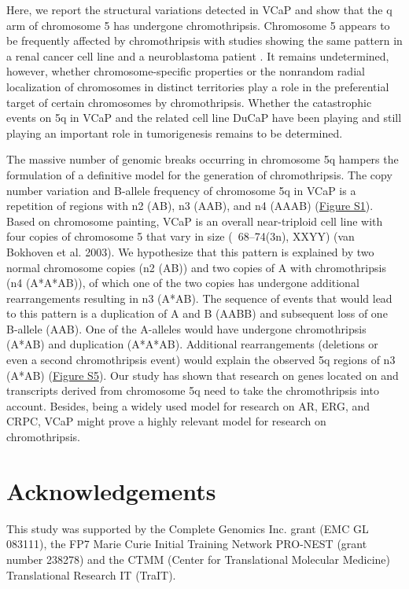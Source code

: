 Here, we report the structural variations detected in VCaP and show that the q arm of chromosome 5 has undergone chromothripsis.
Chromosome 5 appears to be frequently affected by chromothripsis with studies showing the same pattern in a renal cancer cell line
\cite{stephens2011massive} and a neuroblastoma patient \cite{molenaar2012sequencing}. It remains undetermined, however, whether chromosome-specific
properties or the nonrandom radial localization of chromosomes in distinct territories play a role in the preferential target of certain
chromosomes by chromothripsis. Whether the catastrophic events on 5q in VCaP and the related cell line DuCaP have been playing and still
playing an important role in tumorigenesis remains to be determined.

The massive number of genomic breaks occurring in chromosome 5q hampers the formulation of a definitive model for the generation of chromothripsis.
The copy number variation and B-allele frequency of chromosome 5q in VCaP is a repetition of regions with n2 (AB), n3 (AAB), and n4 (AAAB) (\href{https://link.springer.com/article/10.1007/s00439-013-1308-1#SupplementaryMaterial}{Figure S1}).
Based on chromosome painting, VCaP is an overall near-triploid cell line with four copies of chromosome 5 that vary in size (~68–74(3n), XXYY)
(van Bokhoven et al. 2003). We hypothesize that this pattern is explained by two normal chromosome copies (n2 (AB)) and two copies of A with
chromothripsis (n4 (A*A*AB)), of which one of the two copies has undergone additional rearrangements resulting in n3 (A*AB). The sequence of
events that would lead to this pattern is a duplication of A and B (AABB) and subsequent loss of one B-allele (AAB). One of the A-alleles would
have undergone chromothripsis (A*AB) and duplication (A*A*AB). Additional rearrangements (deletions or even a second chromothripsis event) would
explain the observed 5q regions of n3 (A*AB) (\href{https://link.springer.com/article/10.1007/s00439-013-1308-1#SupplementaryMaterial}{Figure S5}). Our study has shown that research on genes located on and transcripts derived from
chromosome 5q need to take the chromothripsis into account. Besides, being a widely used model for research on AR, ERG, and CRPC, VCaP might
prove a highly relevant model for research on chromothripsis.

\section*{Acknowledgements}
This study was supported by the Complete Genomics Inc. grant (EMC GL 083111), the FP7 Marie Curie Initial Training Network PRO-NEST
(grant number 238278) and the CTMM (Center for Translational Molecular Medicine) Translational Research IT (TraIT).

%




